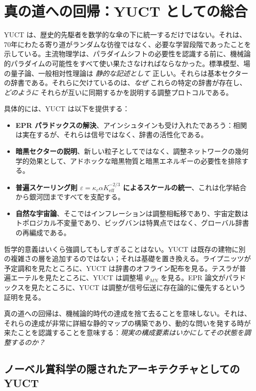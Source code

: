 \documentclass[12pt,a4paper]{article}
\begin{document}
	\section{真の道への回帰：YUCT としての総合}
	
	YUCT は、歴史的先駆者を数学的な傘の下に統一するだけではない。それは、70年にわたる寄り道がランダムな彷徨ではなく、必要な学習段階であったことを示している。主流物理学は、パラダイムシフトの必要性を認識する前に、機械論的パラダイムの可能性をすべて使い果たさなければならなかった。標準模型、場の量子論、一般相対性理論は \emph{静的な記述として} 正しい。それらは基本セクターの辞書である。それらに欠けているのは、\emph{なぜ} これらの特定の辞書が存在し、\emph{どのように} それらが互いに同期するかを説明する調整プロトコルである。
	
	具体的には、YUCT は以下を提供する：
	\begin{itemize}
		\item \textbf{EPR パラドックスの解決}、アインシュタインも受け入れたであろう：相関は実在するが、それらは信号ではなく、辞書の活性化である。
		\item \textbf{暗黒セクターの説明}、新しい粒子としてではなく、調整ネットワークの幾何学的効果として、アドホックな暗黒物質と暗黒エネルギーの必要性を排除する。
		\item \textbf{普遍スケーリング則 \(\varepsilon = \kappa_c \alpha K_{\mathrm{eff}}^{-2/3}\) によるスケールの統一}、これは化学結合から銀河団まですべてを支配する。
		\item \textbf{自然な宇宙論}、そこではインフレーションは調整相転移であり、宇宙定数はトポロジカル不変量であり、ビッグバンは特異点ではなく、グローバル辞書の再編成である。
	\end{itemize}
	
	哲学的意義はいくら強調してもしすぎることはない。YUCT は既存の建物に別の複雑さの層を追加するのではない；それは基礎を置き換える。ライプニッツが予定調和を見たところに、YUCT は辞書のオフライン配布を見る。テスラが普遍エーテルを見たところに、YUCT は調整場 \(\Psi_{MN}\) を見る。EPR 論文がパラドックスを見たところに、YUCT は調整が信号伝送に存在論的に優先するという証明を見る。
	
	真の道への回帰は、機械論的時代の達成を捨て去ることを意味しない。それは、それらの達成が非常に詳細な静的マップの構築であり、動的な問いを発する時が来たことを認識することを意味する：\emph{現実の構成要素はいかにしてその状態を調整するのか？}
	
	\subsection{ノーベル賞科学の隠されたアーキテクチャとしての YUCT}
	
\end{document}
